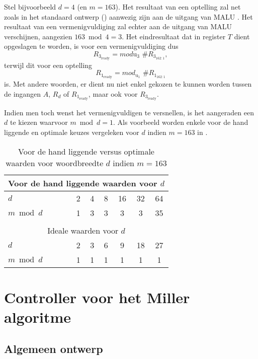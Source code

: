 Stel bijvoorbeeld $d = 4$ (en $m = 	163$). Het resultaat van een optelling zal net zoals in het standaard ontwerp () aanwezig zijn aan de uitgang van MALU . Het resultaat van een vermenigvuldiging zal echter aan de uitgang van MALU  verschijnen, aangezien $163 \bmod 4 = 3$. Het eindresultaat dat in register $T$ dient opgeslagen te worden, is voor een vermenigvuldiging dus
\[R_{3_{\text{ready}}} = mod{\text{u}_3} \text{ \# } R_{3_{162:1}},\]
terwijl dit voor een optelling
\[R_{1_{\text{ready}}} = mod_{\text{u}_1} \text{ \# } R_{1_{162:1}}\]
is. Met andere woorden, er dient nu niet enkel gekozen te kunnen worden tussen de ingangen $A$, $R_d$ of $R_{1_{\text{ready}}}$, maar ook voor $R_{3_{\text{ready}}}$.

Indien men toch wenst het vermenigvuldigen te versnellen, is het aangeraden een $d$ te kiezen waarvoor $m \bmod d = 1$. Als voorbeeld worden enkele voor de hand liggende en optimale keuzes vergeleken voor $d$ indien $m = 163$ in .

\begin{table}[h]
	\caption{Voor de hand liggende versus optimale waarden voor woordbreedte $d$ indien \mbox{$m=163$}}
	\label{tabel-implementatie-woordbreedte-d}

	\centering
	\begin{tabular}{|l|c|c|c|c|c|c|}
		\hline
		\multicolumn{7}{|c|}{Voor de hand liggende waarden voor $d$}\\
		\hline
		$d$			& 2	& 4	& 8	& 16	& 32	& 64\\
		$m \bmod d \qquad$	& 1	& 3	& 3	& 3	& 3	& 35\\
		\hline
		\multicolumn{7}{c}{}\\
		\hline
		\multicolumn{7}{|c|}{Ideale waarden voor $d$}\\
		\hline
		$d$			& 2	& 3	& 6	& 9	& 18	& 27\\
		$m \bmod d$	& 1	& 1	& 1	& 1	& 1	& 1\\
		\hline
	\end{tabular}
\end{table}

\section{Controller voor het Miller algoritme\label{sectie-implementatie-miller}}

\subsection{Algemeen ontwerp\label{subsectie-implementatie-miller-ontwerp}}


